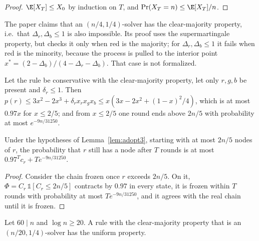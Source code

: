 \begin{proof}
  \leanok
  $\E[X_T] \le X_0$ by induction on $T$, and $\Pr(X_T = n) \le \E[X_T]/n$.
\end{proof}

\begin{remark}
  The paper claims that an $(n/4,1/4)$-solver has the clear-majority
  property, i.e.\ that $\Delta_r, \Delta_b \le 1$ is also impossible. Its
  proof uses the supermartingale property, but checks it only when red is the
  majority; for $\Delta_r, \Delta_b \le 1$ it fails when red is the minority,
  because the process is pulled to the interior point
  $x^* = (2 - \Delta_b)/(4 - \Delta_r - \Delta_b)$. That case is not
  formalized.
\end{remark}

\begin{lemma}\label{lem:adopt3}
  \leanok
  Let the rule be conservative with the clear-majority property, let only
  $r, g, b$ be present and $\delta_r \le 1$. Then
  $p(r) \le 3x^2 - 2x^3 + \delta_r x_r x_g x_b \le x(3x - 2x^2 + (1-x)^2/4)$,
  which is at most $0.97x$ for $x \le 2/5$; and from $x \le 2/5$ one round
  ends above $2n/5$ with probability at most $e^{-9n/31250}$.
\end{lemma}

\begin{lemma}\label{lem:extinct}
  \leanok
  Under the hypotheses of Lemma~\ref{lem:adopt3}, starting with at most $2n/5$
  nodes of $r$, the probability that $r$ still has a node after $T$ rounds is
  at most $0.97^T c_r + T e^{-9n/31250}$.
\end{lemma}

\begin{proof}
  \leanok
  Consider the chain frozen once $r$ exceeds $2n/5$. On it,
  $\Phi = C_r\,\mathbb 1[C_r \le 2n/5]$ contracts by $0.97$ in every state,
  it is frozen within $T$ rounds with probability at most $Te^{-9n/31250}$,
  and it agrees with the real chain until it is frozen.
\end{proof}

\begin{theorem}\label{thm:4_8_b}
  \leanok
  Let $60 \mid n$ and $\log n \ge 20$. A rule with the clear-majority property
  that is an $(n/20, 1/4)$-solver has the uniform property.
\end{theorem}

